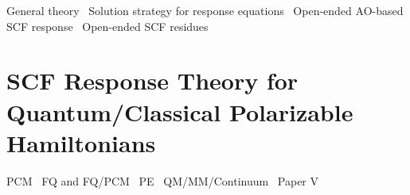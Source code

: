 General theory~\autocite{Olsen1985-nr, Helgaker1992-ph, Olsen1995-pf,
Christiansen1998-pe, Norman2011-ad, Helgaker2012-cz, Pawlowski2015-sq}
Solution strategy for response equations~\autocite{Saad2003-oa,
Saad2011-gm, Kauczor2011-rd, Malmqvist2013-vw}
Open-ended \acrshort{AO}-based \acrshort{SCF} response~\autocite{
Larsen2000-hj, Kjaergaard2008-hy, Thorvaldsen2008-sg,
Kristensen2008-hv, Ringholm2014-gx}
Open-ended \acrshort{SCF} residues~\autocite{Friese2015-kb}


\section{SCF Response Theory for Quantum/Classical Polarizable Hamiltonians}\label{sec:csm-response}

\acrshort{PCM}~\autocite{Cammi1994-qj, Cammi1996-wf, Cammi1996-vx,
Cammi1999-rb, Cammi2003-qy, Frediani2005-nc, Ferrighi2010-pm}
\acrshort{FQ} and \acrshort{FQ}/\acrshort{PCM}~\autocite{Lipparini2012-hx, Lipparini2012-tl, Lipparini2013-ud}
\acrshort{PE}~\autocite{Olsen2010-wa}
\acrshort{QM}/\acrshort{MM}/Continuum~\autocite{Steindal2011-ki, Caprasecca2012-ir}
Paper V~\autocite{pcm-openrsp}
